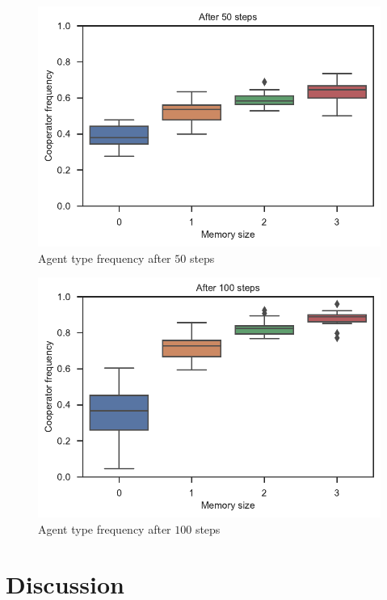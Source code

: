 \documentclass[english]{article}
\begin{document}
\begin{figure}[h!]
  \centering
  \includegraphics{cooperator_frequency_memory_50steps.pdf}
  \caption{Agent type frequency after $50$ steps}
  \label{table:cooperator_frequency_converged_50}
\end{figure}
\begin{figure}[h!]
  \centering
  \includegraphics{cooperator_frequency_memory_100steps.pdf}
  \caption{Agent type frequency after $100$ steps}
  \label{table:cooperator_frequency_converged_100}
\end{figure}




\section{Discussion}
\end{document}
